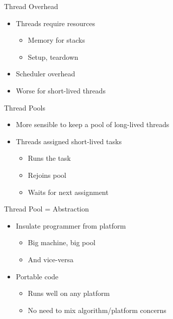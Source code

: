 \begin{frame}{Thread Overhead}
  \begin{itemize}
  \item Threads require resources
    \begin{itemize}
    \item Memory for stacks
    \item Setup, teardown
    \end{itemize}
  \item Scheduler overhead
  \item Worse for short-lived threads
  \end{itemize}
\end{frame}

\begin{frame}{Thread Pools}
  \begin{itemize}
  \item More sensible to keep a pool of long-lived threads
  \item Threads assigned short-lived tasks
    \begin{itemize}
    \item Runs the task
    \item Rejoins pool
    \item Waits for next assignment
    \end{itemize}
  \end{itemize}
\end{frame}

\begin{frame}{Thread Pool = Abstraction}
  \begin{itemize}
  \item Insulate programmer from platform
    \begin{itemize}
    \item Big machine, big pool
    \item And vice-versa 
    \end{itemize}
  \item Portable code
    \begin{itemize}
    \item Runs well on any platform
    \item No need to mix algorithm/platform concerns
    \end{itemize}
  \end{itemize}
\end{frame}

